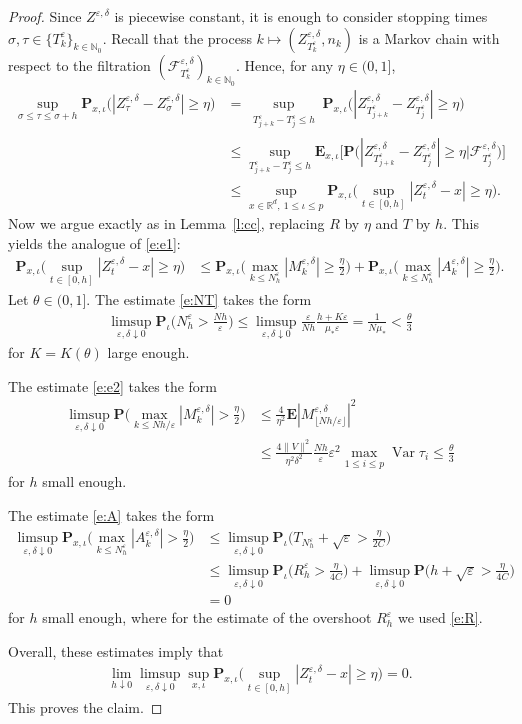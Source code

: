 \documentclass[10pt]{article}
\newcommand{\E}{\mathbf{E}}
\renewcommand{\P}{\mathbf{P}}
\newcommand{\1}{1\!\!\!\;{\rm I}}
\theoremstyle{plain}
\theoremstyle{definition}
\newcommand{\e}{\varepsilon}
\newcommand{\ba}{\begin{equation}\begin{aligned}}
\newcommand{\ea}{\end{aligned}\end{equation}}
\DeclareMathOperator{\Var}{Var}
\newcommand{\rF}{\mathscr{F}}
\numberwithin{equation}{section}
\begin{document}
\begin{proof}
Since $Z^{\e,\delta}$ is piecewise constant, it is enough to consider stopping times
$\sigma,\tau\in\{T_k^\e\}_{k\in\mathbb N_0}$.
Recall that the process
$k\mapsto (Z^{\e,\delta}_{T_k^\e},n_k)$
is a Markov chain with respect to the filtration
$(\rF^{\e,\delta}_{T_k^\e})_{k\in\mathbb N_0}$.
Hence, for any $\eta\in(0,1]$,
\ba
\sup_{\sigma\leq\tau\le\sigma+h}
\P_{x,\iota}\Big(|Z^{\e,\delta}_\tau-Z^{\e,\delta}_\sigma|\geq\eta\Big)
&=
\sup_{\substack{T^\e_{j+k}-T^\e_j\leq h}}
\P_{x,\iota}\Big(
|Z^{\e,\delta}_{T^\e_{j+k}}-Z^{\e,\delta}_{T^\e_j}|
\geq\eta\Big) \\
&\leq
\sup_{T^\e_{j+k}-T^\e_j\leq h}
\E_{x,\iota}\Big[
\P\Big(
|Z^{\e,\delta}_{T^\e_{j+k}}-Z^{\e,\delta}_{T^\e_j}|
\geq\eta \Big| \rF^{\e,\delta}_{T^\e_j} \Big)\Big] \\
&\leq
\sup_{x\in\mathbb R^d,\ 1\leq\iota\le p}
\P_{x,\iota}\Big( \sup_{t\in[0,h]}|Z^{\e,\delta}_t-x| \geq\eta \Big).
\ea
Now we argue exactly as in Lemma~\ref{l:cc}, replacing $R$ by $\eta$ and $T$ by $h$. This yields the analogue of \eqref{e:e1}:
\ba
\P_{x,\iota}\Big(
\sup_{t\in[0,h]}|Z^{\e,\delta}_t-x|
\geq\eta
\Big)
&\leq
\P_{x,\iota}\Big( \max_{k\le N_h^\e}|M_k^{\e,\delta}| \geq\frac{\eta}{2} \Big)
+
\P_{x,\iota}\Big( \max_{k\le N_h^\e}|A_k^{\e,\delta}|
\ge\frac{\eta}{2} \Big).
\ea
Let $\theta\in(0,1]$.
The estimate \eqref{e:NT} takes the form
\ba
\limsup_{\e,\delta\downarrow 0}
\P_\iota\Big(N_h^\e> \frac{Nh}{\e} \Big)
\leq \limsup_{\e,\delta\downarrow 0}
\frac{\e}{Nh}\frac{h+K\e}{\mu_*\e}
=\frac{1}{N\mu_*}
<\frac{\theta}{3}
\ea
for $K=K(\theta)$ large enough.

The estimate \eqref{e:e2} takes the form
\ba
\limsup_{\e,\delta\downarrow 0} \P\Big( \max_{k\leq  Nh/\e} |M^{\e,\delta}_k|> \frac{\eta}{2}\Big)
&\leq \frac{4}{\eta^2}\E |M^{\e,\delta}_{\lfloor Nh/\e\rfloor}|^2\\
&\leq \frac{4\|V\|^2}{\eta^2\delta^2} \frac{Nh}{\e}\e^2 \max_{1\leq i\leq p} \Var\tau_i
\leq\frac{\theta}{3}
\ea
for $h$ small enough.

The estimate \eqref{e:A} takes the form
\ba
\limsup_{\e,\delta\downarrow 0}
\P_{x,\iota}\Big(\max_{k\leq N^\e_h }|A_k^{\e,\delta}|> \frac{\eta}{2}\Big)
&\leq \limsup_{\e,\delta\downarrow 0}\P_\iota\Big(T_{N_h^\e} +\sqrt{\e}> \frac{\eta}{2C}\Big)\\
&\leq \limsup_{\e,\delta\downarrow 0}\P_\iota\Big(R^\e_h > \frac{\eta}{4C}\Big)
+ \limsup_{\e,\delta\downarrow 0}\P\Big(h +\sqrt{\e}> \frac{\eta}{4C}\Big)\\
&=0
\ea
for $h$ small enough, where for the estimate of the overshoot $R^\e_h$ we used \eqref{e:R}.

Overall, these estimates imply that
\ba
\lim_{h\downarrow 0}\limsup_{\e,\delta\downarrow 0} \sup_{x,\iota}
\P_{x,\iota}\Big( \sup_{t\in[0,h]}|Z^{\e,\delta}_t-x| \geq\eta \Big)= 0.
\ea
This proves the claim.
\end{proof}
\end{document}
